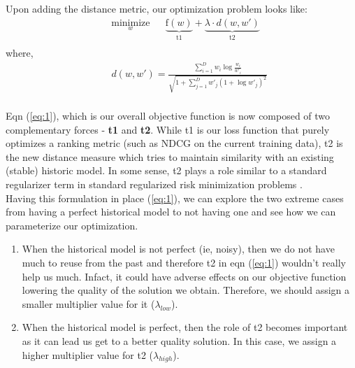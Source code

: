 \documentclass[a4paper]{article}
\begin{document}
\noindent Upon adding the distance metric, our optimization problem looks like: \\
\begin{equation} \label{eq:1}
\begin{aligned}
& \underset{w}{\text{minimize}}
& & \underbrace{\mathrm{f}(w)}_\text{t1} + \underbrace{\lambda \cdot d(w, w')}_\text{t2}\\
\end{aligned}
\end{equation}
where,
\begin{equation}
\begin{aligned}
& & d(w, w') = \frac{\sum_{i=1}^{D} w_i \log \frac{w_i}{w'_i} }{ \sqrt{1 + \sum_{j=1}^D w'_j (1 + \log w'_j)^2 } } \\
\end{aligned}
\end{equation}

\noindent Eqn (\ref{eq:1}), which is our overall objective function is now composed of two complementary forces - \textbf{t1} and \textbf{t2}. While t1 is our loss function that purely optimizes a ranking metric (such as NDCG on the current training data), t2 is the new distance measure which tries to maintain similarity with an existing (stable) historic model. In some sense, t2 plays a role similar to a standard regularizer term in standard regularized risk minimization problems \citep{le2007bundle}. \\

\noindent Having this formulation in place (\ref{eq:1}), we can explore the two extreme cases from having a perfect historical model to not having one and see how we can parameterize our optimization.

\begin{enumerate}
\item When the historical model is not perfect (ie, noisy), then we do not have much to reuse from the past and therefore t2 in eqn (\ref{eq:1}) wouldn't really help us much. Infact, it could have adverse effects on our objective function lowering the quality of the solution we obtain. Therefore, we should assign a smaller multiplier value for it ($\lambda_{low}$).
\item When the historical model is perfect, then the role of t2 becomes important as it can lead us get to a better quality solution. In this case, we assign a higher multiplier value for t2 ($\lambda_{high}$).
\end{enumerate}
\end{document}
